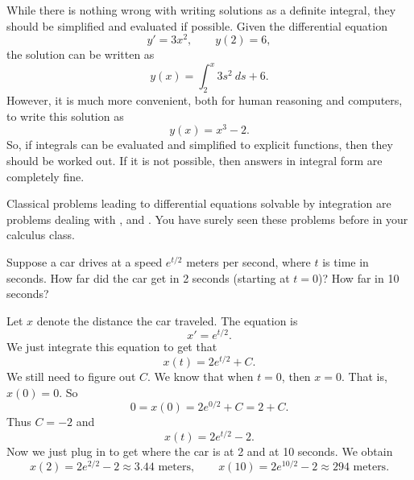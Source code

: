 While there is nothing wrong with writing solutions as a definite integral, they should be simplified and evaluated if possible. Given the differential equation
\[ y' = 3x^2, \qquad y(2) = 6, \] the solution can be written as 
\[ y(x) = \int_2^x 3s^2\ ds + 6.\] However, it is much more convenient, both for human reasoning and computers, to write this solution as 
\[ y(x) = x^3 - 2.\] So, if integrals can be evaluated and simplified to explicit functions, then they should be worked out. If it is not possible, then answers in integral form are completely fine. 

Classical problems leading to differential equations solvable by integration
are problems 
dealing with ,
 and .  You have surely seen these
problems before in your calculus class.

\begin{example}
Suppose a car drives at a speed $e^{t/2}$ meters per second,
where $t$ is time in seconds.
How far did the car get in 2 seconds (starting at $t=0$)?  How far in 10 seconds?
\end{example}

\begin{exampleSol}
Let $x$ denote the distance the car traveled.
The equation is
\begin{equation*}
x' = e^{t/2} .
\end{equation*}
We just integrate this equation to get that
\begin{equation*}
x(t) = 2 e^{t/2} + C . 
\end{equation*}
We still need to figure out $C$.  We know that when $t=0$, then
$x=0$.  That is, $x(0) = 0$.  So
\begin{equation*}
0 = x(0) = 2e^{0/2} + C = 2 + C .
\end{equation*}
Thus $C = -2$ and 
\begin{equation*}
x(t) = 2 e^{t/2} - 2 .
\end{equation*}
Now we just plug in to get where the car is at 2 and at 10 seconds.
We obtain
\begin{equation*}
x(2) = 2e^{2/2} - 2 \approx 3.44 \text{ meters} ,
\qquad
x(10) = 2e^{10/2} - 2 \approx 294 \text{ meters} .
\end{equation*}
\end{exampleSol}

